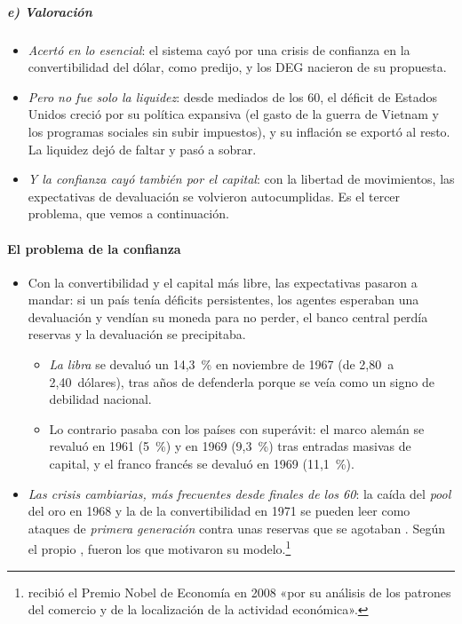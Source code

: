 \documentclass[11pt]{article}
\begin{document}
\subparagraph{e) Valoración}

\begin{itemize}
\item \emph{Acertó en lo esencial}: el sistema cayó por una crisis de confianza en la convertibilidad del dólar, como predijo, y los DEG nacieron de su propuesta.
\item \emph{Pero no fue solo la liquidez}: desde mediados de los 60, el déficit de Estados Unidos creció por su política expansiva (el gasto de la guerra de Vietnam y los programas sociales sin subir impuestos), y su inflación se exportó al resto. La liquidez dejó de faltar y pasó a sobrar\nocite{BordoEichengreen1993Retrospective}.
\item \emph{Y la confianza cayó también por el capital}: con la libertad de movimientos, las expectativas de devaluación se volvieron autocumplidas. Es el tercer problema, que vemos a continuación.
\end{itemize}

\paragraph{El problema de la confianza}

\begin{itemize}
\item Con la convertibilidad y el capital más libre, las expectativas pasaron a mandar: si un país tenía déficits persistentes, los agentes esperaban una devaluación y vendían su moneda para no perder, el banco central perdía reservas y la devaluación se precipitaba.
  \begin{itemize}
  \item \emph{La libra} se devaluó un 14,3~\% en noviembre de 1967 (de 2,80~a 2,40~dólares), tras años de defenderla porque se veía como un signo de debilidad nacional.
  \item Lo contrario pasaba con los países con superávit: el marco alemán se revaluó en 1961 (5~\%) y en 1969 (9,3~\%) tras entradas masivas de capital, y el franco francés se devaluó en 1969 (11,1~\%).
  \end{itemize}
\item \emph{Las crisis cambiarias, más frecuentes desde finales de los 60}: la caída del \emph{pool} del oro en 1968 y la de la convertibilidad en 1971 se pueden leer como ataques de \emph{primera generación} contra unas reservas que se agotaban\nocite{Garber1993Collapse} . Según el propio , fueron los que motivaron su modelo\nocite{Krugman2001Next}.\footnote{ recibió el Premio Nobel de Economía en 2008 «por su análisis de los patrones del comercio y de la localización de la actividad económica»\nocite{Nobel2008Krugman}.}
\end{itemize}
\end{document}
